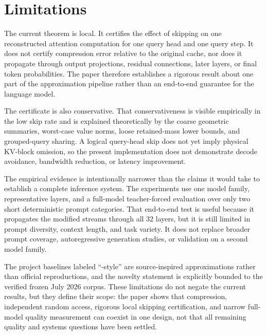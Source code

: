 \section{Limitations}

The current theorem is local. It certifies the effect of skipping on one reconstructed attention computation for one query head and one query step. It does not certify compression error relative to the original cache, nor does it propagate through output projections, residual connections, later layers, or final token probabilities. The paper therefore establishes a rigorous result about one part of the approximation pipeline rather than an end-to-end guarantee for the language model.

The certificate is also conservative. That conservativeness is visible empirically in the low skip rate and is explained theoretically by the coarse geometric summaries, worst-case value norms, loose retained-mass lower bounds, and grouped-query sharing. A logical query-head skip does not yet imply physical KV-block omission, so the present implementation does not demonstrate decode avoidance, bandwidth reduction, or latency improvement.

The empirical evidence is intentionally narrower than the claims it would take to establish a complete inference system. The experiments use one model family, representative layers, and a full-model teacher-forced evaluation over only two short deterministic prompt categories. That end-to-end test is useful because it propagates the modified streams through all \(32\) layers, but it is still limited in prompt diversity, context length, and task variety. It does not replace broader prompt coverage, autoregressive generation studies, or validation on a second model family.

The project baselines labeled \enquote{-style} are source-inspired approximations rather than official reproductions, and the novelty statement is explicitly bounded to the verified frozen July 2026 corpus. These limitations do not negate the current results, but they define their scope: the paper shows that compression, independent random access, rigorous local skipping certification, and narrow full-model quality measurement can coexist in one design, not that all remaining quality and systems questions have been settled.
